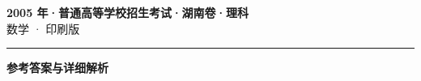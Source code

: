 \documentclass[zihao=5, a4paper]{ctexart}
\begin{document}
\begin{center}
  {\Large\bfseries 2005 年·普通高等学校招生考试·湖南卷·理科}\\[4pt]
  {\large 数学 · 印刷版}
\end{center}
\medskip
{}

\par\bigskip\hrule\bigskip
{}
\begin{center}{\large\bfseries 参考答案与详细解析}\end{center}
\smallskip

\end{document}
